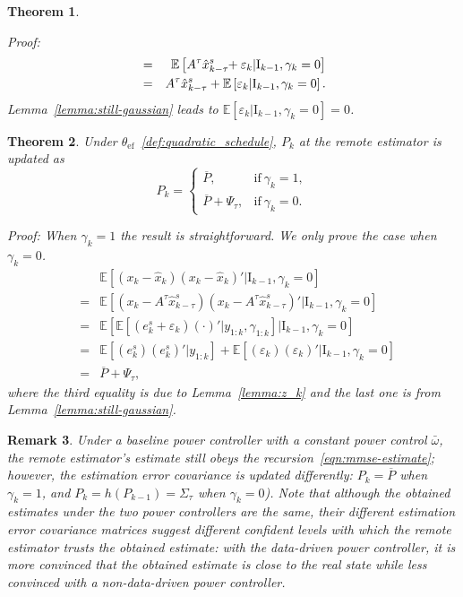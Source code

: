 \documentclass[twocolumn]{autart}    \usepackage{cite}
\newtheorem{theorem}{Theorem}[section]
\newtheorem{remark}[theorem]{Remark}
\begin{document}
{{\begin{theorem}
\begin{pf*}{Proof:}
\begin{eqnarray*}
    &=&\mathbb{E}\left[A^\tau\hat x_{k-
    \tau}^s\hspace{-1mm}+\varepsilon_k|
    \mathrm{I}_{k-1},\gamma_k=0\right]\\
    &=&A^\tau\hat x_{k-\tau}^s+
    \mathbb{E}\left[\varepsilon_k|
    \mathrm{I}_{k-1},\gamma_k=0\right].
    \end{eqnarray*}
    Lemma~\ref{lemma:still-gaussian} leads to
    $\mathbb{E}\left[\varepsilon_k|
    \mathrm{I}_{k-1},\gamma_k=0\right]=0$.
    \end{pf*}
\end{theorem}
\begin{theorem} \label{theorem:form_P_k_on}
Under $\theta_{\mathrm{ef}}$~\eqref{def:quadratic_schedule},
$P_k$ at
the remote estimator is updated as
\begin{equation} \label{eqn:on-line-update-p}
    P_k = \left\{\begin{array}{ll}\overline{P}, &  \mathrm{if}~\gamma_k=1,\\
                            \overline P+\Psi_\tau ,  & \mathrm{if}~\gamma_k=0.
\end{array}\right.
\end{equation}
\begin{pf*}{Proof:}
    When $\gamma_k=1$ the result is straightforward.
    We only prove the case when $\gamma_k=0$.
    \begin{eqnarray*}
    &  &\mathbb{E}\left[(x_{k}-\hat{x}_{k})
    (x_{k}-\hat{x}_{k})'|\mathrm{I}_{k-1}, \gamma_{k}=0\right] \\&=&\mathbb{E}\left[(x_{k}-
    A^{\tau}
    \hat{x}_{k-\tau}^s)(x_{k}-
    A^{\tau}
    \hat{x}_{k-\tau}^s)'|
    \mathrm{I}_{k-1}, \gamma_{k}=0\right] \\& = & \mathbb{E}\left[\mathbb{E}\left[
    (e_k^s +\varepsilon_k)(\cdot)'
    |y_{1:k},\gamma_{1:k}\right]
    |\mathrm{I}_{k-1},\gamma_{k}=0\right]\\
    & = & \mathbb{E}[(e_{k}^s)(e_{k}^s)'|y_{1:k}]+
    \mathbb{E}\left[(\varepsilon_k)(\varepsilon_k)'|
    \mathrm{I}_{k-1},\gamma_k=0\right]\\
    & = & \overline{P} +\Psi_\tau,
    \end{eqnarray*}
    where the third equality is due to
    Lemma~\ref{lemma:z_k} and the last one
    is from Lemma~\ref{lemma:still-gaussian}.
\end{pf*}
\end{theorem}
\begin{remark}
{Under a baseline power controller with a constant power control $\bar \omega$, the remote estimator's estimate still obeys the recursion~\eqref{eqn:mmse-estimate}; however, the estimation error covariance is updated differently: $P_k=\overline{P}$ when $\gamma_k=1$, and $P_k=h(P_{k-1}) = \Sigma_{\tau}$ when $\gamma_k=0$). Note that although the obtained estimates under the two power controllers are the same, their different estimation error covariance matrices suggest different confident levels with which the remote estimator trusts the obtained estimate: with the data-driven power controller, it is more convinced that the obtained estimate is close to the real state while less convinced with a non-data-driven power controller.}
\end{remark}
}}
\end{document}

